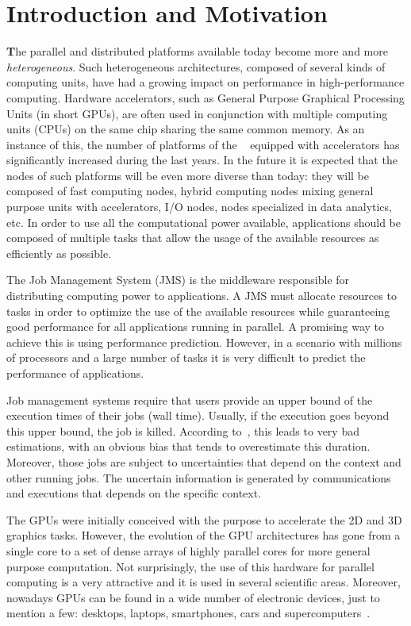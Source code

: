 \chapter{Introduction and Motivation} \label{Chap:Intro}
\lettrine[findent=2pt]{\textbf{T}}{}he parallel and distributed platforms available today become more and more \textit{heterogeneous}.
Such heterogeneous architectures, composed of several kinds of computing units, have had a growing impact on performance in high-performance computing.
Hardware accelerators, such as General Purpose Graphical Processing Units (in short GPUs), are often used in conjunction with multiple computing units (CPUs) on the same chip sharing the same common memory.
As an instance of this, the number of platforms of the ~\cite{TOP500} equipped with accelerators has significantly increased during the last years. In the future it is expected that the nodes of such platforms will be even more diverse than today: they will be composed of fast computing nodes, hybrid computing nodes mixing general purpose units with accelerators, I/O nodes, nodes specialized in data analytics, etc. In order to use all the computational power available, applications should be composed of multiple tasks that allow the usage of the available resources as efficiently as possible. 

The Job Management System (JMS) is the middleware responsible for distributing computing power to applications. A JMS must allocate resources to tasks in order to optimize the use of the available resources while guaranteeing good performance for all applications running in parallel. A promising way to achieve this is using performance prediction. However, in a scenario with millions of processors and a large number of tasks it is very difficult to predict the performance of applications.

Job management systems require that users provide an upper bound of the execution times of their jobs (wall time). Usually, if the execution goes beyond this upper bound, the job is killed. According to~\cite{Gaj:Trystram:2002}, this leads to very bad estimations, with an obvious bias that tends to overestimate this duration. Moreover, those jobs are subject to uncertainties that depend on the context and other running jobs. The uncertain information is generated by communications and executions that depends on the specific context.

The GPUs were initially conceived with the purpose to accelerate the 2D and 3D graphics tasks. However, the evolution of the GPU architectures has gone from a single core to a set of dense arrays of highly parallel cores for more general purpose computation. Not surprisingly, the use of this hardware for parallel computing is a very attractive and it is used in several scientific areas. Moreover, nowadays GPUs can be found in a wide number of electronic devices, just to mention a few: desktops, laptops, smartphones, cars and supercomputers~\citep[chap. 10]{verber2014future}. 


